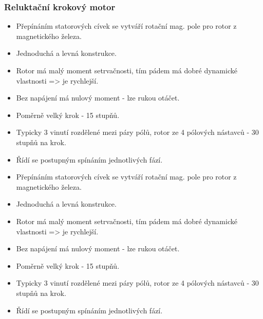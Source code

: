 \subsubsection*{Reluktační krokový motor}
\begin{itemize}
  \item Přepínáním statorových cívek se vytváří rotační mag. pole pro rotor z magnetického železa.
  \item Jednoduchá a levná konstrukce.
  \item Rotor má malý moment setrvačnosti, tím pádem má dobré dynamické vlastnosti => je rychlejší.
  \item Bez napájení má nulový moment - lze rukou otáčet.
  \item Poměrně velký krok - 15 stupňů.
  \item Typicky 3 vinutí rozdělené mezi páry pólů, rotor ze 4 pólových nástavců - 30 stupňů na krok.
  \item Řídí se postupným spínáním jednotlivých fází.
    \item Přepínáním statorových cívek se vytváří rotační mag. pole pro rotor z magnetického železa.
    \item Jednoduchá a levná konstrukce.
    \item Rotor má malý moment setrvačnosti, tím pádem má dobré dynamické vlastnosti => je rychlejší.
    \item Bez napájení má nulový moment - lze rukou otáčet.
    \item Poměrně velký krok - 15 stupňů.
    \item Typicky 3 vinutí rozdělené mezi páry pólů, rotor ze 4 pólových nástavců - 30 stupňů na krok.
    \item Řídí se postupným spínáním jednotlivých fází.
\end{itemize}


